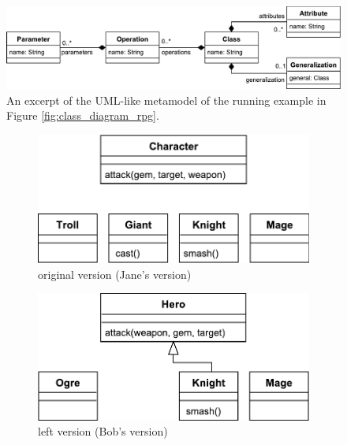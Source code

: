\begin{figure}[]
  \centering
  \includegraphics[width=0.7\linewidth]{miniuml_metamodel}
  \caption{An excerpt of the UML-like metamodel of the running example in Figure \ref{fig:class_diagram_rpg}.}
  \label{fig:miniuml_metamodel}
\end{figure}

\begin{figure}[]
  \centering
  \begin{subfigure}[t]{0.31\linewidth}
    \includegraphics[width=\linewidth]{class_diagram_origin}
    \caption{original version (Jane's version)}
    \label{fig:class_diagram_origin}
  \end{subfigure}
  \hfill
  \begin{subfigure}[t]{0.31\linewidth}
    \includegraphics[width=\linewidth]{class_diagram_left}
    \caption{left version (Bob's version)}
    \label{fig:class_diagram_left}
  \end{subfigure}
  \hfill
  \begin{subfigure}[t]{0.31\linewidth}

\end{subfigure}
\end{figure}
